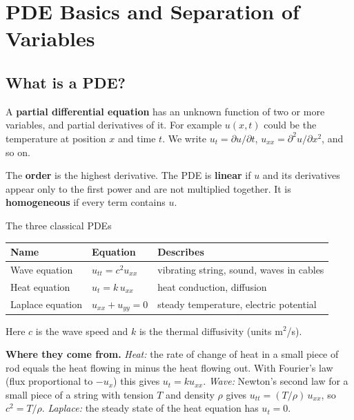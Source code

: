 \chapter{PDE Basics and Separation of Variables}

\section{What is a PDE?}

A \textbf{partial differential equation} has an unknown function of two or more variables, and partial derivatives of it. For example $u(x,t)$ could be the temperature at position $x$ and time $t$. We write $u_t = \partial u/\partial t$, $u_{xx} = \partial^2u/\partial x^2$, and so on.

The \textbf{order} is the highest derivative. The PDE is \textbf{linear} if $u$ and its derivatives appear only to the first power and are not multiplied together. It is \textbf{homogeneous} if every term contains $u$.

\begin{defbox}{The three classical PDEs}
\begin{center}
\renewcommand{\arraystretch}{1.5}
\begin{tabular}{@{}lll@{}}
\toprule
Name & Equation & Describes \\
\midrule
Wave equation & $u_{tt} = c^2u_{xx}$ & vibrating string, sound, waves in cables \\
Heat equation & $u_t = k\,u_{xx}$ & heat conduction, diffusion \\
Laplace equation & $u_{xx} + u_{yy} = 0$ & steady temperature, electric potential \\
\bottomrule
\end{tabular}
\end{center}
Here $c$ is the wave speed and $k$ is the thermal diffusivity (units m$^2$/s).
\end{defbox}

\textbf{Where they come from.} \emph{Heat:} the rate of change of heat in a small piece of rod equals the heat flowing in minus the heat flowing out. With Fourier's law (flux proportional to $-u_x$) this gives $u_t = ku_{xx}$. \emph{Wave:} Newton's second law for a small piece of a string with tension $T$ and density $\rho$ gives $u_{tt} = (T/\rho)\,u_{xx}$, so $c^2 = T/\rho$. \emph{Laplace:} the steady state of the heat equation has $u_t = 0$.

